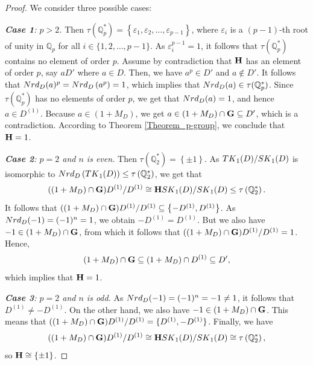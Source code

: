 \documentclass[10pt,a4paper]{amsart}
\begin{document}
\begin{proof}
	We consider three possible cases:
	
	\medskip 
	
	\medskip 
	
	\textit{\textbf{Case 1}: $p>2$. } Then $\tau\left(\mathbb{Q}_p^*\right) = \left\{\varepsilon_1,\varepsilon_2,\ldots,\varepsilon_{p-1}\right\}$, where $\varepsilon_i$ is a $(p-1)$-th root of unity in $\mathbb{Q}_p$ for all $i \in \{1,2,\ldots,p-1\}$. As $\varepsilon_i^{p-1} = 1$, it follows that $\tau\left(\mathbb{Q}_p^*\right)$ contains no element of order $p$. Assume by contradiction that ${\bf H}$ has an element of order $p$, say $aD'$ where $a\in D$. Then, we have $a^p \in D'$ and $a \notin D'$. It follows that ${\rm Nrd}_D(a)^p= {\rm Nrd}_D\left(a^p\right) =1$, which implies that ${\rm Nrd}_D(a) \in \tau(\mathbb{Q}_p^*)$. Since $\tau(\mathbb{Q}_p^*)$ has no elements of order $p$, we get that ${\rm Nrd}_D(a) =1$, and hence $a \in D^{(1)}$. Because $a\in \left(1+M_D\right)$, we get $a \in \left(1+M_D\right)\cap {\bf G} \subseteq D'$, which is a contradiction. According to Theorem \ref{Theorem_p-group}, we conclude that ${\bf H}=1$.
	
	\medskip 
	
	\textit{\textbf{Case 2}: $p=2$ and $n$ is even.} Then $\tau\left(\mathbb{Q}_2^*\right) = \left\{\pm1\right\}$. As ${\rm TK}_1(D)/{\rm SK}_1(D)$ is isomorphic to $ {\rm Nrd}_D\left({\rm TK}_1(D)\right) \le \tau\left(\mathbb{Q}_2^*\right)$, we get that
	$$
	((1+M_D)\cap {\bf G})D^{(1)}/D^{(1)} \cong {\bf H}{\rm SK}_1(D)/{\rm 
		SK}_1(D)  \le 
	\tau\left(\mathbb{Q}_2^*\right).
	$$
	It follows that $((1+M_D)\cap {\bf G})D^{(1)}/D^{(1)} \subseteq \left\{-D^{(1)},D^{(1)}\right\}$. As ${\rm Nrd}_D(-1) = (-1)^n = 1$, we obtain $-D^{(1)} = D^{(1)}$. But we also have $-1 \in\left(1+M_D\right)\cap {\bf G}$, from which it follows that $((1+M_D)\cap {\bf G})D^{(1)}/D^{(1)} = 1$. Hence,
	$$
	\left(1+M_D\right)\cap {\bf G} \subseteq \left(1+M_D\right) \cap D^{(1)} \subseteq D',
	$$
	which implies that ${\bf H}=1$.
	
	\medskip 
	
	\textit{\textbf{Case 3}: $p=2$ and $n$ is odd.} As ${\rm Nrd}_D(-1) = (-1)^n = -1 \ne 1$, it follows that $D^{(1)} \ne -D^{(1)}$. On the other hand, we also have $-1 \in (1+M_D)\cap {\bf G}$. This means that $((1+M_D)\cap {\bf G})D^{(1)}/D^{(1)} = \{D^{(1)},-D^{(1)}\}$. Finally, we have 
	$$
	((1+M_D)\cap {\bf G})D^{(1)}/D^{(1)} \cong {\bf H}{\rm SK}_1(D)/{\rm SK}_1(D) \cong\tau\left(\mathbb{Q}_2^*\right),
	$$
	so ${\bf H} \cong \{\pm 1 \}$.
\end{proof}
\end{document}
